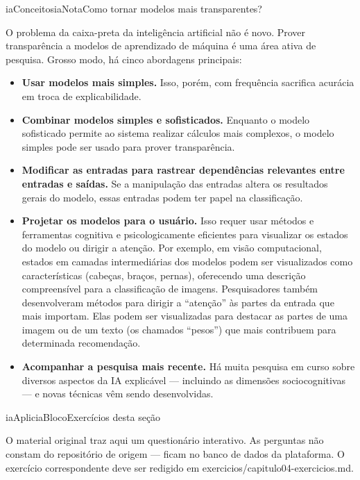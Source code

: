 \documentclass[
  11pt,
]{article}
\renewcommand{\texttt}[1]{{\color{iaAmeixa}\small\ttfamily #1}}
\newenvironment{tecnica}[1][Nota tecnica]{\begin{iabox}{iaConceitos}{iaNota}{#1}}{\end{iabox}}
\newenvironment{reflexao}[1][Para pensar]{\begin{iabox}{iaAplic}{iaBloco}{#1}}{\end{iabox}}
\begin{document}
\begin{tecnica}[Como tornar modelos mais transparentes?]

O problema da caixa-preta da inteligência artificial não é novo. Prover
transparência a modelos de aprendizado de máquina é uma área ativa de
pesquisa. Grosso modo, há cinco abordagens principais:

\begin{itemize}
\item
  \textbf{Usar modelos mais simples.} Isso, porém, com frequência
  sacrifica acurácia em troca de explicabilidade.
\item
  \textbf{Combinar modelos simples e sofisticados.} Enquanto o modelo
  sofisticado permite ao sistema realizar cálculos mais complexos, o
  modelo simples pode ser usado para prover transparência.
\item
  \textbf{Modificar as entradas para rastrear dependências relevantes
  entre entradas e saídas.} Se a manipulação das entradas altera os
  resultados gerais do modelo, essas entradas podem ter papel na
  classificação.
\item
  \textbf{Projetar os modelos para o usuário.} Isso requer usar métodos
  e ferramentas cognitiva e psicologicamente eficientes para visualizar
  os estados do modelo ou dirigir a atenção. Por exemplo, em visão
  computacional, estados em camadas intermediárias dos modelos podem ser
  visualizados como características (cabeças, braços, pernas),
  oferecendo uma descrição compreensível para a classificação de
  imagens. Pesquisadores também desenvolveram métodos para dirigir a
  ``atenção'' às partes da entrada que mais importam. Elas podem ser
  visualizadas para destacar as partes de uma imagem ou de um texto (os
  chamados ``pesos'') que mais contribuem para determinada recomendação.
\item
  \textbf{Acompanhar a pesquisa mais recente.} Há muita pesquisa em
  curso sobre diversos aspectos da IA explicável --- incluindo as
  dimensões sociocognitivas --- e novas técnicas vêm sendo
  desenvolvidas.
\end{itemize}

\end{tecnica}

\begin{reflexao}[Exercícios desta seção]

O material original traz aqui um questionário interativo. As perguntas
não constam do repositório de origem --- ficam no banco de dados da
plataforma. O exercício correspondente deve ser redigido em
\texttt{exercicios/capitulo04-exercicios.md}.

\end{reflexao}
\end{document}

